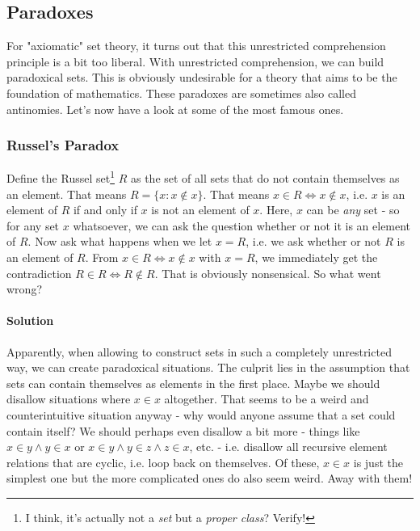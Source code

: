 \subsection{Paradoxes}
For "axiomatic" set theory, it turns out that this unrestricted comprehension principle is a bit too liberal. With unrestricted comprehension, we can build paradoxical sets. This is obviously undesirable for a theory that aims to be the foundation of mathematics. These paradoxes are sometimes also called antinomies. Let's now have a look at some of the most famous ones.

\subsubsection{Russel's Paradox}
Define the Russel set\footnote{I think, it's actually not a \emph{set} but a \emph{proper class}? Verify!} $R$ as the set of all sets that do not contain themselves as an element. That means $R = \{x: x \notin x\}$. That means $x \in R \Leftrightarrow x \notin x$, i.e. $x$ is an element of $R$ if and only if $x$ is not an element of $x$. Here, $x$ can be \emph{any} set - so for any set $x$ whatsoever, we can ask the question whether or not it is an element of $R$. Now ask what happens when we let $x = R$, i.e. we ask whether or not $R$ is an element of $R$. From $x \in R \Leftrightarrow x \notin x$ with $x = R$, we immediately get the contradiction $R \in R \Leftrightarrow R \notin R$. That is obviously nonsensical. So what went wrong?


\paragraph{Solution} Apparently, when allowing to construct sets in such a completely unrestricted way, we can create paradoxical situations. The culprit lies in the assumption that sets can contain themselves as elements in the first place. Maybe we should disallow situations where $x \in x$ altogether. That seems to be a weird and counterintuitive situation anyway - why would anyone assume that a set could contain itself? We should perhaps even disallow a bit more - things like $x \in y \wedge y \in x$ or $x \in y \wedge y \in z \wedge z \in x$, etc. - i.e. disallow all recursive element relations that are cyclic, i.e. loop back on themselves. Of these, $x \in x$ is just the simplest one but the more complicated ones do also seem weird. Away with them!

